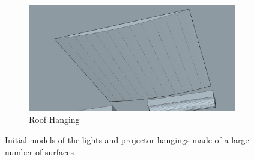 \documentclass[../../main.tex]{subfiles}
\begin{document}
\begin{figure}[ht]
				\begin{subfigure}[t]{3in}
					\centering
					\includegraphics[scale = 0.25]{Sections/Implementation/Modelling/images/concave1.png}
					\caption{Roof Hanging}
				\end{subfigure}
				\caption{Initial models of the lights and projector hangings made of a large number of surfaces}
				\label{surfaces}
			\end{figure}

\end{document}
